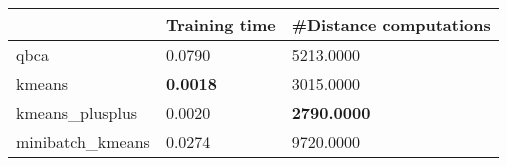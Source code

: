 \begin{table}[htbp]
\centering
\begin{tabular}{lll}
\toprule
 & Training time & #Distance computations \\
\midrule
qbca & 0.0790 & 5213.0000 \\
kmeans & \textbf{0.0018} & 3015.0000 \\
kmeans_plusplus & 0.0020 & \textbf{2790.0000} \\
minibatch_kmeans & 0.0274 & 9720.0000 \\
\bottomrule
\end{tabular}
\end{table}
